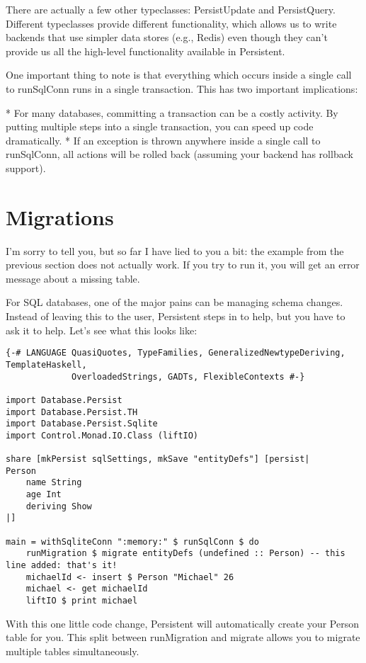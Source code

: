 There are actually a few other typeclasses: PersistUpdate and PersistQuery. Different typeclasses provide different functionality, which allows us to write backends that use simpler data stores (e.g., Redis) even though they can't provide us all the high-level functionality available in Persistent.

One important thing to note is that everything which occurs inside a single call to runSqlConn runs in a single transaction. This has two important implications:

* For many databases, committing a transaction can be a costly activity. By putting multiple steps into a single transaction, you can speed up code dramatically.
* If an exception is thrown anywhere inside a single call to runSqlConn, all actions will be rolled back (assuming your backend has rollback support).

\section{Migrations}

I'm sorry to tell you, but so far I have lied to you a bit: the example from the previous section does not actually work. If you try to run it, you will get an error message about a missing table.

For SQL databases, one of the major pains can be managing schema changes. Instead of leaving this to the user, Persistent steps in to help, but you have to ask it to help. Let's see what this looks like:

\begin{lstlisting}
{-# LANGUAGE QuasiQuotes, TypeFamilies, GeneralizedNewtypeDeriving, TemplateHaskell,
             OverloadedStrings, GADTs, FlexibleContexts #-}

import Database.Persist
import Database.Persist.TH
import Database.Persist.Sqlite
import Control.Monad.IO.Class (liftIO)

share [mkPersist sqlSettings, mkSave "entityDefs"] [persist|
Person
    name String
    age Int
    deriving Show
|]

main = withSqliteConn ":memory:" $ runSqlConn $ do
    runMigration $ migrate entityDefs (undefined :: Person) -- this line added: that's it!
    michaelId <- insert $ Person "Michael" 26
    michael <- get michaelId
    liftIO $ print michael
\end{lstlisting}

With this one little code change, Persistent will automatically create your Person table for you. This split between runMigration and migrate allows you to migrate multiple tables simultaneously.

